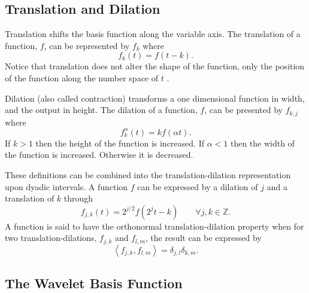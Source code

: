 \subsection {Translation and Dilation}

Translation shifts the basis function along the variable axis. The translation of a function, $f$, can be represented by $f_k$ where
\[
f_k(t) = f(t-k).
\]
Notice that translation does not alter the shape of the function, only the position of the function along the number space of $t$ \cite{translation}.

Dilation (also called contraction) transforms a one dimensional function in width, and the output in height.   The dilation of a function, $f$, can be presented by $f_{k,j}$ where
\[
f_{k}^\alpha(t) = kf(\alpha t).
\]
If $k>1$ then the height of the function is increased. If $\alpha<1$ then the width of the function is increased. Otherwise it is decreased. 

These definitions can be combined into the translation-dilation representation upon dyadic intervals. A function $f$ can be expressed by a dilation of $j$ and a translation of $k$ through
\[
f_{j,k}(t) = 2^{j/2}f(2^jt-k) \qquad \forall j, k \in {\mathbb Z}.
\]
A function is said to have the orthonormal translation-dilation property when for two translation-dilations, $f_{j,k}$ and $f_{l,m}$, the result can be expressed by \cite{ChuiIntro}
\[
\left< f_{j,k} , f_{l,m} \right> = \delta_{j,l} \delta_{k,m}.
\]

\subsection {The Wavelet Basis Function}

